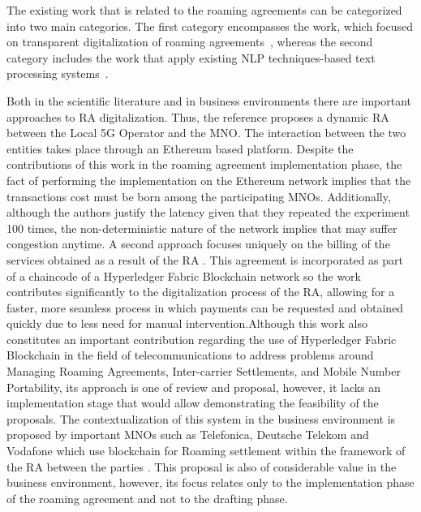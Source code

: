 \documentclass[conference]{style/IEEEtran}
\begin{document}
The existing work that is related to the roaming agreements can be categorized into two main categories. The first category encompasses the work, which focused on transparent digitalization of roaming agreements~\cite{9369516, 9024541, Huillet2020}, whereas the second category includes the work that apply existing NLP techniques-based text processing systems~\cite{8487847, 9138070, 9104105}.

Both in the scientific literature and in business environments there are important approaches to RA digitalization. Thus, the reference \cite{9369516} proposes a dynamic RA between the Local 5G Operator and the MNO. The interaction between the two entities takes place through an Ethereum based platform. Despite the contributions of this work in the roaming agreement implementation phase, the fact of performing the implementation on the Ethereum network implies that the transactions cost must be born among the participating MNOs. Additionally, although the authors justify the latency given that they repeated the experiment 100 times, the non-deterministic nature of the network implies that may suffer congestion anytime. A second approach focuses uniquely on the billing of the services obtained as a result of the RA \cite{9024541}. This agreement is incorporated as part of a chaincode of a Hyperledger Fabric Blockchain network so the work contributes significantly to the digitalization process of the RA, allowing for a faster, more seamless process in which payments can be requested and obtained quickly due to less need for manual intervention.Although this work also constitutes an important contribution regarding the use of Hyperledger Fabric Blockchain in the field of telecommunications to address problems around Managing Roaming Agreements, Inter-carrier Settlements, and Mobile Number Portability, its approach is one of review and proposal, however, it lacks an implementation stage that would allow demonstrating the feasibility of the proposals. The contextualization of this system in the business environment is proposed by important MNOs such as Telefonica, Deutsche Telekom and Vodafone which use blockchain for Roaming settlement within the framework of the RA between the parties \cite{Huillet2020}. This proposal is also of considerable value in the business environment, however, its focus relates only to the implementation phase of the roaming agreement and not to the drafting phase. 
\end{document}
